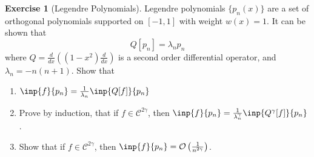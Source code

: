 \documentclass[12pt]{article}
\theoremstyle{definition}
\newtheorem{exercise}{\color{YellowOrange}Exercise}
\theoremstyle{definition}
\begin{document}
\begin{exercise}[Legendre Polynomials]
	Legendre polynomials $\{p_n(x)\}$ are a set of orthogonal polynomials supported on $[-1,1]$ with weight $w(x) = 1$. It can be shown that 
	\begin{equation}
		Q[p_n] = \lambda_np_n
	\end{equation}
	where $Q = \frac{d}{dx}\left((1-x^2)\frac{d}{dx}\right)$ is a second order differential operator, and $\lambda_n = -n(n+1)$. Show that
	\begin{enumerate}
		\item $\inp{f}{p_n} = \frac{1}{\lambda_n} \inp{Q[f]}{p_n}$
		\item Prove by induction, that if $f \in \mathcal{C}^{2\gamma}$, then $\inp{f}{p_n} = \frac{1}{\lambda_n^\gamma} \inp{Q^\gamma[f]}{p_n}$.
		\item Show that if $f \in \mathcal{C}^{2\gamma}$, then $\inp{f}{p_n} = \mathcal{O}\left(\frac{1}{n^{2\gamma}}\right)$.
	\end{enumerate}
\end{exercise}
\end{document}
